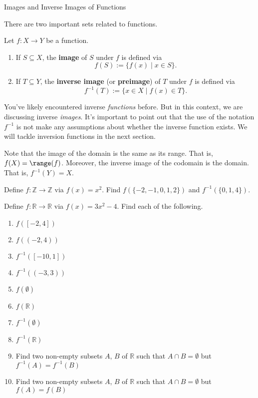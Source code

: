 \begin{section}{Images and Inverse Images of Functions}\label{sec:Images and Inverse Images}

There are two important sets related to functions.

\begin{definition}
Let $f:X\to Y$ be a function.  \begin{enumerate}[label=\textrm{(\alph*)}]
\item If $S\subseteq X$, the \textbf{image} of $S$ under $f$ is defined via
\[
f(S):=\{f(x) \mid  x\in S\}.
\]
\item  If $T\subseteq Y$, the \textbf{inverse image} (or \textbf{preimage}) of $T$ under $f$ is defined via
\[
f^{-1}(T):=\{x\in X \mid  f(x)\in T\}.
\]
\end{enumerate}
\end{definition}

You've likely encountered inverse \emph{functions} before. But in this context, we are discussing inverse \emph{images}. It's important to point out that the use of the notation $f^{-1}$ is not make any assumptions about whether the inverse function exists. We will tackle inversion functions in the next section.

Note that the image of the domain is the same as its range.  That is, $f(X)=\range(f)$. Moreover, the inverse image of the codomain is the domain.  That is, $f^{-1}(Y)=X$.

\begin{exercise}
Define $f:\mathbb{Z}\to\mathbb{Z}$ via $f(x)=x^2$. Find $f(\{-2,-1,0,1,2\})$ and $f^{-1}(\{0,1,4\})$.
\end{exercise}

\begin{exercise}
Define $f:\mathbb{R}\to\mathbb{R}$ via $f(x)=3x^2-4$.
Find each of the following.
\begin{enumerate}[label=\textrm{(\alph*)}]
\item $f([-2,4])$
\item $f((-2,4))$
\item $f^{-1}([-10,1])$
\item $f^{-1}((-3,3))$
\item $f(\emptyset)$
\item $f(\mathbb{R})$
\item $f^{-1}(\emptyset)$
\item $f^{-1}(\mathbb{R})$
\item Find two non-empty subsets $A$, $B$ of $\mathbb{R}$ such that $A\cap B=\emptyset$ but $f^{-1}(A)=f^{-1}(B)$
\item Find two non-empty subsets $A$, $B$ of $\mathbb{R}$ such that $A\cap B=\emptyset$ but $f(A)=f(B)$
\end{enumerate}
\end{exercise}


\end{section}
